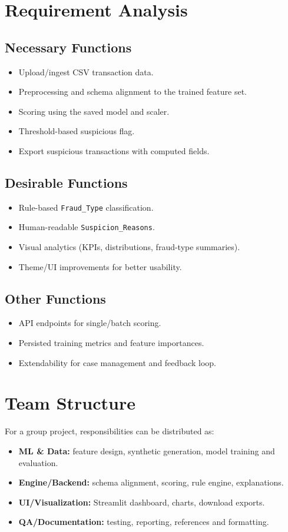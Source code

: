 \documentclass[12pt,a4paper]{report}
\begin{document}
\section{Requirement Analysis}
\subsection{Necessary Functions}
\begin{itemize}
  \item Upload/ingest CSV transaction data.
  \item Preprocessing and schema alignment to the trained feature set.
  \item Scoring using the saved model and scaler.
  \item Threshold-based suspicious flag.
  \item Export suspicious transactions with computed fields.
\end{itemize}

\subsection{Desirable Functions}
\begin{itemize}
  \item Rule-based \texttt{Fraud\_Type} classification.
  \item Human-readable \texttt{Suspicion\_Reasons}.
  \item Visual analytics (KPIs, distributions, fraud-type summaries).
  \item Theme/UI improvements for better usability.
\end{itemize}

\subsection{Other Functions}
\begin{itemize}
  \item API endpoints for single/batch scoring.
  \item Persisted training metrics and feature importances.
  \item Extendability for case management and feedback loop.
\end{itemize}

\section{Team Structure}
For a group project, responsibilities can be distributed as:
\begin{itemize}
  \item \textbf{ML \& Data:} feature design, synthetic generation, model training and evaluation.
  \item \textbf{Engine/Backend:} schema alignment, scoring, rule engine, explanations.
  \item \textbf{UI/Visualization:} Streamlit dashboard, charts, download exports.
  \item \textbf{QA/Documentation:} testing, reporting, references and formatting.
\end{itemize}
\end{document}
